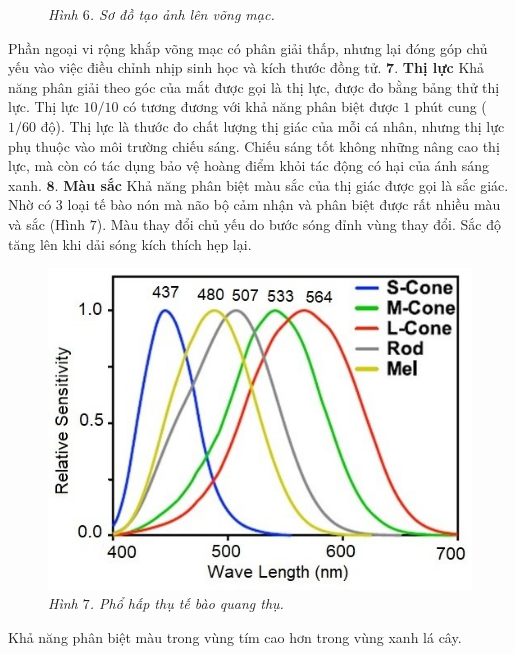 \begin{multicols}{2}
\begin{figure}[H]
		\caption{\small\textit{\color{timhieukhoahoc}Hình $6$. Sơ đồ tạo ảnh lên võng mạc.}}
		\vspace*{-10pt}
	\end{figure}
	Phần ngoại vi rộng khắp võng mạc có phân giải thấp, nhưng lại đóng góp chủ yếu vào việc điều chỉnh nhịp sinh học và kích thước đồng tử. 
	\vskip 0.1cm
	$\pmb{7.}$ \textbf{\color{timhieukhoahoc}Thị lực}
	\vskip 0.1cm
	Khả năng phân giải theo góc của mắt được gọi là thị lực, được đo bằng bảng thử thị lực. Thị lực $10/10$ có tương đương với khả năng phân biệt được $1$ phút cung ($1/60$ độ). 
	\vskip 0.1cm
	Thị lực là thước đo chất lượng thị giác của mỗi cá nhân, nhưng thị lực phụ thuộc vào môi trường chiếu sáng. Chiếu sáng tốt không những nâng cao thị lực, mà còn có tác dụng bảo vệ hoàng điểm khỏi tác động có hại của ánh sáng xanh. 
	\vskip 0.1cm
	$\pmb{8.}$ \textbf{\color{timhieukhoahoc}Màu sắc}
	\vskip 0.1cm
	Khả năng phân biệt màu sắc của thị giác được gọi là sắc giác. Nhờ có $3$ loại tế bào nón mà não bộ cảm nhận và phân biệt được rất nhiều màu và sắc (Hình $7$). Màu thay đổi chủ yếu do bước sóng đỉnh vùng thay đổi. Sắc độ tăng lên khi dải sóng kích thích hẹp lại.
	\begin{figure}[H]
		\vspace*{-5pt}
		\centering
		\captionsetup{labelformat= empty, justification=centering}
		\includegraphics[width= 0.9\linewidth]{7}
		\caption{\small\textit{\color{timhieukhoahoc}Hình $7$. Phổ hấp thụ tế bào quang thụ.}}
		\vspace*{-10pt}
	\end{figure}
	Khả năng phân biệt màu trong vùng tím cao hơn trong vùng xanh lá cây. 
	\begin{figure}[H]

\end{figure}
\end{multicols}
